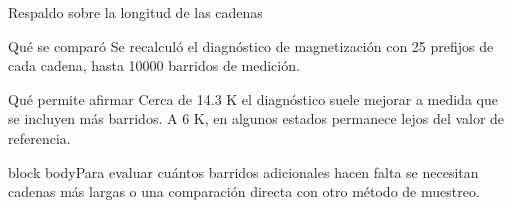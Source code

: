 \documentclass[aspectratio=169,10pt]{beamer}
\newcommand{\idea}[1]{\vspace{2pt}\begin{beamercolorbox}[rounded=true,sep=5pt,wd=\linewidth]{block body}\small #1\end{beamercolorbox}}
\begin{document}
\begin{frame}{Respaldo sobre la longitud de las cadenas}
\begin{block}{Qué se comparó}
Se recalculó el diagnóstico de magnetización con 25 prefijos de cada cadena, hasta 10000 barridos de medición.
\end{block}
\begin{block}{Qué permite afirmar}
Cerca de 14.3 K el diagnóstico suele mejorar a medida que se incluyen más barridos. A 6 K, en algunos estados permanece lejos del valor de referencia.
\end{block}
\idea{Para evaluar cuántos barridos adicionales hacen falta se necesitan cadenas más largas o una comparación directa con otro método de muestreo.}
\end{frame}
\end{document}
